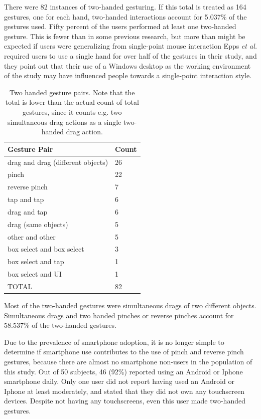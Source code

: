 There were 82 instances of two-handed gesturing. 
If this total is treated as 164 gestures, one for each hand, two-handed interactions account for 5.037\% of the gestures used.
Fifty percent of the users performed at least one two-handed gesture. 
This is fewer than in some previous research, but more than might be expected if users were generalizing from single-point mouse interaction \citep{micire2010multi, epps2006study}
Epps \emph{et al.} required users to use a single hand for over half of the gestures in their study, and they point out that their use of a Windows desktop as the working environment of the study may have influenced people towards a single-point interaction style. 



\begin{table}
	\centering
	\begin{tabular}{l l}
		Gesture Pair & Count\\
		\hline
		drag and drag (different objects) & 26 \\
		pinch & 22\\
		reverse pinch & 7\\
		tap and tap & 6\\
		drag and tap & 6\\
		drag (same objects) & 5\\
		other and other & 5\\		
		box select and box select & 3\\
		box select and tap & 1\\
		box select and UI & 1\\
		\hline
		TOTAL & 82\\
	\end{tabular}
	\caption{Two handed gesture pairs. Note that the total is lower than the actual count of total gestures, since it counts e.g. two simultaneous drag actions as a single two-handed drag action.}
\end{table}

Most of the two-handed gestures were simultaneous drags of two different objects. 
Simultaneous drags and two handed pinches or reverse pinches account for 58.537\% of the two-handed gestures.  

Due to the prevalence of smartphone adoption, it is no longer simple to determine if smartphone use contributes to the use of pinch and reverse pinch gestures, because there are almost no smartphone non-users in the population of this study. 
Out of 50 subjects, 46 (92\%) reported using an Android or Iphone smartphone daily. 
Only one user did not report having used an Android or Iphone at least moderately, and stated that they did not own any touchscreen devices. 
Despite not having any touchscreens, even this user made two-handed gestures. 

